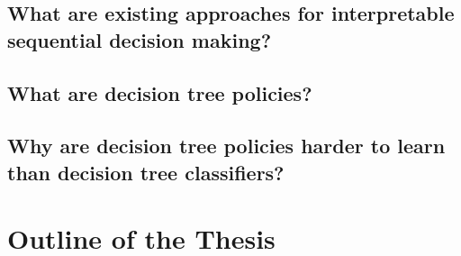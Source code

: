 \subsection{What are existing approaches for interpretable sequential decision making?}


\subsection{What are decision tree policies?}


\subsection{Why are decision tree policies harder to learn than decision tree classifiers?}

\section{Outline of the Thesis}